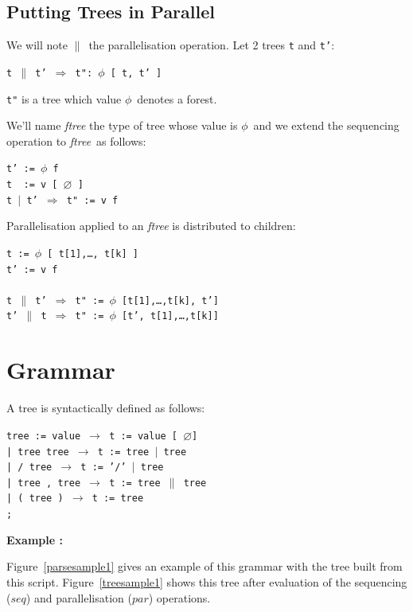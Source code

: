 \documentclass{article}
\newcommand{\exemple}	{\vspace*{1mm}\hspace*{-4mm}\textbf{Example :}}
\newcommand{\code}	[2][0.9]		{\vspace{0mm}\begin{center}\colorbox{mygrey}{
							\begin{minipage}[t]{#1\columnwidth} 
							{\small \texttt{#2}}
							\end{minipage}}\end{center}}
\newcommand{\op}	[1]		{\vspace{0mm}\begin{center}\colorbox{mygrey}{
							\begin{minipage}[t]{0.9\columnwidth} 
							{\small \texttt{#1}}
							\end{minipage}}\end{center}}
\newcommand{\nulltree}	{\ensuremath{\varnothing}}
\newcommand{\seq}		{\ensuremath{|}}
\newcommand{\paral}		{\ensuremath{\parallel}}
\newcommand{\foret}		{\ensuremath{\phi}}
\newcommand{\ftree}		{ftree}
\newcommand{\etc}		{…}
\newcommand{\ula}		{\hspace*{8mm}}
\begin{document}
\subsection{Putting Trees in Parallel}
We will note \paral\ the parallelisation operation. 
Let 2 trees \texttt{t} and \texttt{t'}:
\op{t \paral\ t'  $\Rightarrow$  t": \foret\ [ t, t' ]
}
\texttt{t"} is a tree which value \foret\ denotes a forest. 

We'll name \emph{\ftree} the type of tree whose value is \foret\ and we extend the sequencing operation to \emph{\ftree}\ as follows:
\op{t' :=  \foret\ f\\
t \ :=  v [ \nulltree\ ]\\
t \seq\ t'  $\Rightarrow$  t" := v f
}

Parallelisation applied to an \emph{\ftree} is distributed to children: 
\op{t :=  \foret\ [ t[1],\etc, t[k] ]\\
t' :=  v f\\
\\
t \paral\ t'  $\Rightarrow$  t" := \foret\ [t[1],\etc,t[k], t']\\
t' \paral\ t  $\Rightarrow$  t" := \foret\ [t', t[1],\etc,t[k]]
}



\section{Grammar}\label{agram}

A tree is syntactically defined as follows:
\code{tree := value      \hspace*{8mm} $\to$ t := value [ \nulltree ] \\
\ula | tree tree         \hspace*{4mm} $\to$ t := tree \seq\ tree \\
\ula | / tree            \hspace*{9.7mm} $\to$ t := '/' \seq\ tree\\
\ula | tree , tree       \hspace*{0mm}  $\to$ t := tree \paral\ tree \\
\ula | ( tree )          \hspace*{6mm} $\to$ t := tree \\
\ula ;\\
}

\exemple

Figure~\ref{parsesample1} gives an example of this grammar with the tree built from this script. Figure~\ref{treesample1} shows this tree after evaluation of the sequencing ($seq$) and parallelisation ($par$) operations.
\end{document}
